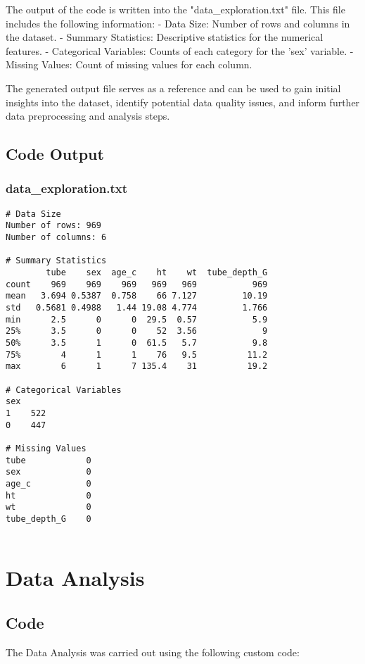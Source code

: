 \documentclass[11pt]{article}
\begin{document}
The output of the code is written into the "data\_exploration.txt" file. This file includes the following information:
- Data Size: Number of rows and columns in the dataset.
- Summary Statistics: Descriptive statistics for the numerical features.
- Categorical Variables: Counts of each category for the 'sex' variable.
- Missing Values: Count of missing values for each column.

The generated output file serves as a reference and can be used to gain initial insights into the dataset, identify potential data quality issues, and inform further data preprocessing and analysis steps.

\subsection{Code Output}

\subsubsection*{data\_exploration.txt}

\begin{Verbatim}[tabsize=4]
# Data Size
Number of rows: 969
Number of columns: 6

# Summary Statistics
        tube    sex  age_c    ht    wt  tube_depth_G
count    969    969    969   969   969           969
mean   3.694 0.5387  0.758    66 7.127         10.19
std   0.5681 0.4988   1.44 19.08 4.774         1.766
min      2.5      0      0  29.5  0.57           5.9
25%      3.5      0      0    52  3.56             9
50%      3.5      1      0  61.5   5.7           9.8
75%        4      1      1    76   9.5          11.2
max        6      1      7 135.4    31          19.2

# Categorical Variables
sex
1    522
0    447

# Missing Values
tube            0
sex             0
age_c           0
ht              0
wt              0
tube_depth_G    0


\end{Verbatim}

\section{Data Analysis}
\subsection{{Code}}
The Data Analysis was carried out using the following custom code:
\end{document}
